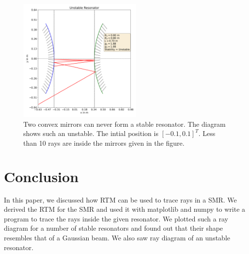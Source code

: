 \documentclass[12pt]{article}
\begin{document}
\begin{figure}
    \centering
    \includegraphics[width=0.55\textwidth]{images/unstable.png}
    \caption{Two convex mirrors can never form a stable resonator. The diagram shows such an unstable. The intial position is \([-0.1, 0.1]^T\). Less than 10 rays are inside the mirrors given in the figure.}
    \label{fig:unstable}
\end{figure}
\clearpage
\newpage
\section{Conclusion}
In this paper, we discussed how RTM can be used to trace rays in a SMR. We derived the RTM for the SMR and used it with {\color{cyan}matplotlib} and {\color{cyan}numpy} to write a program to trace the rays inside the given resonator. We plotted such a ray diagram for a number of stable resonators and found out that their shape resembles that of a Gaussian beam. We also saw ray diagram of an unstable resonator.
\printbibliography
\end{document}
